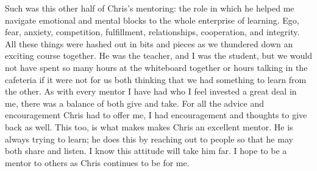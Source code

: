 \documentclass[a4paper, 11pt]{article} %
\begin{document}
Such was this other half of Chris’s mentoring: the role in which he helped me navigate emotional and mental blocks to the whole enterprise of learning. Ego, fear, anxiety, competition, fulfillment, relationships, cooperation, and integrity. All these things were hashed out in bits and pieces as we thundered down an exciting course together. He was the teacher, and I was the student, but we would not have spent so many hours at the whiteboard together or hours talking in the cafeteria if it were not for us both thinking that we had something to learn from the other. As with every mentor I have had who I feel invested a great deal in me, there was a balance of both give and take. For all the advice and encouragement Chris had to offer me, I had encouragement and thoughts to give back as well. This too, is what makes makes Chris an excellent mentor. He is always trying to learn; he does this by reaching out to people so that he may both share and listen. I know this attitude will take him far. I hope to be a mentor to others as Chris continues to be for me.
\end{document}
